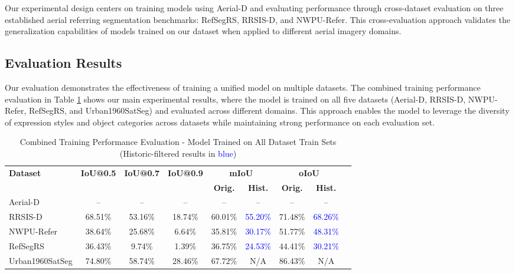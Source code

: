 Our experimental design centers on training models using Aerial-D and evaluating performance through cross-dataset evaluation on three established aerial referring segmentation benchmarks: RefSegRS, RRSIS-D, and NWPU-Refer. This cross-evaluation approach validates the generalization capabilities of models trained on our dataset when applied to different aerial imagery domains.

\subsection{Evaluation Results}
\label{subsec:evaluation_results}

Our evaluation demonstrates the effectiveness of training a unified model on multiple datasets. The combined training performance evaluation in Table \ref{tab:combined_training_results} shows our main experimental results, where the model is trained on all five datasets (Aerial-D, RRSIS-D, NWPU-Refer, RefSegRS, and Urban1960SatSeg) and evaluated across different domains. This approach enables the model to leverage the diversity of expression styles and object categories across datasets while maintaining strong performance on each evaluation set.

\begin{table}[t]
\centering
\caption{Combined Training Performance Evaluation - Model Trained on All Dataset Train Sets (Historic-filtered results in \textcolor{blue}{blue})}
\label{tab:combined_training_results}
\begin{tabular}{@{}lcccccccc@{}}
\toprule
\textbf{Dataset} & \textbf{IoU@0.5} & \textbf{IoU@0.7} & \textbf{IoU@0.9} & \multicolumn{2}{c}{\textbf{mIoU}} & \multicolumn{2}{c}{\textbf{oIoU}} \\
\cmidrule(lr){5-6} \cmidrule(lr){7-8}
 & & & & \textbf{Orig.} & \textbf{Hist.} & \textbf{Orig.} & \textbf{Hist.} \\
\midrule
Aerial-D & -- & -- & -- & -- & \textcolor{blue}{--} & -- & \textcolor{blue}{--} \\
RRSIS-D & 68.51\% & 53.16\% & 18.74\% & 60.01\% & \textcolor{blue}{55.20\%} & 71.48\% & \textcolor{blue}{68.26\%} \\
NWPU-Refer & 38.64\% & 25.68\% & 6.64\% & 35.81\% & \textcolor{blue}{30.17\%} & 51.77\% & \textcolor{blue}{48.31\%} \\
RefSegRS & 36.43\% & 9.74\% & 1.39\% & 36.75\% & \textcolor{blue}{24.53\%} & 44.41\% & \textcolor{blue}{30.21\%} \\
Urban1960SatSeg & 74.80\% & 58.74\% & 28.46\% & 67.72\% & N/A & 86.43\% & N/A \\
\bottomrule
\end{tabular}
\end{table}


